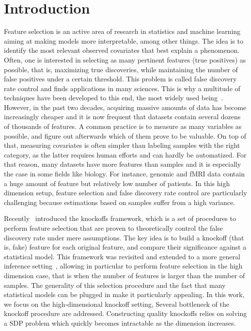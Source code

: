 \cleardoublepage
\chapter*{Introduction}

Feature selection is an active area of research in statistics and machine learning aiming at
making models more interpretable, among other things.
The idea is to identify the most relevant observed covariates that best explain a phenomenon.
Often, one is interested in selecting as many pertinent features (true positives) as possible,
that is, maximizing true discoveries,
while maintaining the number of false positives under a certain threshold.
This problem is called false discovery rate control and finds applications in many sciences.
This is why a multitude of techniques have been developed to this end,
the most widely used being~\cite{bh}.
However, in the past two decades, acquiring massive amounts of data has become increasingly cheaper
and it is now frequent that datasets contain several dozens of thousands of features.
A common practice is to measure as many variables as possible,
and figure out afterwards which of them prove to be valuable.
On top of that, measuring covariates is often simpler than labeling samples with the right category,
as the latter requires human efforts and can hardly be automatized.
For that reason, many datasets have more features than samples
and it is especially the case in some fields like biology.
For instance, genomic and fMRI data contain a huge amount of feature but relatively low number of patients.
In this high dimension setup, feature selection and false discovery rate control are particularly challenging
because estimations based on samples suffer from a high variance.

Recently~\citet{fixed_x_knockoffs} introduced the knockoffs framework,
which is a set of procedures to perform feature selection
that are proven to theoretically control the false discovery rate under mere assumptions.
The key idea is to build a knockoff (that is, fake) feature for each original feature,
and compare their significance against a statistical model.
This framework was revisited and extended to a more general inference setting~\citep{model_x_knockoffs},
allowing in particular to perform feature selection in the high dimension case,
that is when the number of features is larger than the number of samples.
The generality of this selection procedure
and the fact that many statistical models can be plugged in make it particularly appealing.
In this work, we focus on the high-dimensional knockoff setting,
Several bottleneck of the knockoff procedure are addressed.
Constructing quality knockoffs relies on solving a SDP problem
which quickly becomes intractable as the dimension increases.

